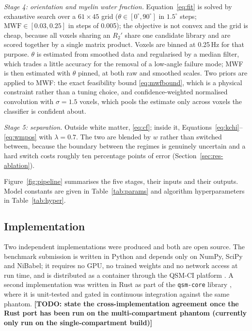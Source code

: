 \documentclass[AMA,STIX2COL,Linenumberson]{MRM}
\newcommand{\TODO}[1]{{\color{red}\textbf{[TODO: #1]}}}
\newcommand{\TODO}[1]{}
\begin{document}
\emph{Stage 4: orientation and myelin water fraction.} Equation~\eqref{eq:fit} is solved by exhaustive search over a $61\times45$ grid ($\theta\in[0^\circ,90^\circ]$ in $1.5^\circ$ steps; $\mathrm{MWF}\in[0.03,0.25]$ in steps of 0.005); the objective is not convex and the grid is cheap, because all voxels sharing an $R_2'$ share one candidate library and are scored together by a single matrix product. Voxels are binned at 0.25\,Hz for that purpose. $\theta$ is estimated from smoothed data and regularised by a median filter, which trades a little accuracy for the removal of a low-angle failure mode; MWF is then estimated with $\theta$ pinned, at both raw and smoothed scales. Two priors are applied to MWF: the exact feasibility bound \eqref{eq:mwfbound}, which is a physical constraint rather than a tuning choice, and confidence-weighted normalised convolution with $\sigma=1.5$ voxels, which pools the estimate only across voxels the classifier is confident about.

\emph{Stage 5: separation.} Outside white matter, \eqref{eq:cf}; inside it, Equations~\eqref{eq:kchi}--\eqref{eq:wmpos} with $\lambda=0.7$. The two are blended by $w$ rather than switched between, because the boundary between the regimes is genuinely uncertain and a hard switch costs roughly ten percentage points of error (Section~\ref{sec:res-ablation}).

Figure~\ref{fig:pipeline} summarises the five stages, their inputs and their outputs. Model constants are given in Table~\ref{tab:params} and algorithm hyperparameters in Table~\ref{tab:hyper}.

\subsection{Implementation}

Two independent implementations were produced and both are open source. The benchmark submission is written in Python and depends only on NumPy, SciPy and NiBabel; it requires no GPU, no trained weights and no network access at run time, and is distributed as a container through the QSM-CI platform \cite{stewart_qsmci_2026}. A second implementation was written in Rust as part of the \texttt{qsm-core} library \cite{qsmrs_2026}, where it is unit-tested and gated in continuous integration against the same phantom. \TODO{state the cross-implementation agreement once the Rust port has been run on the multi-compartment phantom (currently only run on the single-compartment build)}
\end{document}
